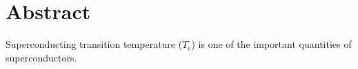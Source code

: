 


\chapter*{Abstract}

Superconducting transition temperature ($T_{\mathrm c}$) is one of the important quantities of superconductors. 


\clearpage


